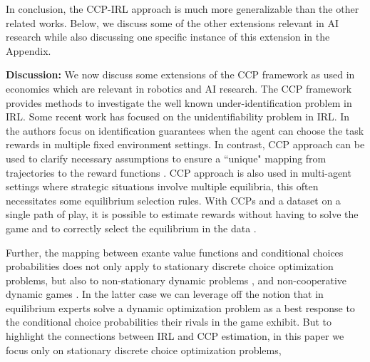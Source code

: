 \documentclass{article}
\begin{document}
In conclusion, the CCP-IRL approach is much more generalizable than the other related works. Below, we discuss some of the other extensions relevant in AI research while also discussing one specific instance of this extension in the Appendix.


\textbf{Discussion:} 
We now discuss some extensions of the CCP framework as used in economics which are relevant in robotics and AI research.  
The CCP framework provides methods to investigate the well known under-identification problem in IRL. Some recent work \cite{amin2017repeated} has focused on the unidentifiability problem in IRL. In \cite{amin2017repeated} the authors focus on identification guarantees when the agent can choose the task rewards in multiple fixed environment settings. In contrast, CCP approach can be used to clarify necessary assumptions to ensure a ``unique" mapping from trajectories to the reward functions \cite{magnac}. CCP approach is also used in multi-agent settings where strategic situations involve multiple equilibria, this often necessitates some equilibrium selection rules. With CCPs and a dataset on a single path of play, it is possible to estimate rewards without having to solve the game and to correctly select the equilibrium in the data \cite{pese}.

Further, the mapping between exante value functions and conditional choices probabilities does not only apply to stationary discrete choice optimization problems, but also to non-stationary dynamic problems \cite{arcidiacono2014nonstationary}, and non-cooperative dynamic games \cite{bajari}. In the latter case we can leverage off the notion that in equilibrium experts solve a dynamic optimization problem as a best response to the conditional choice probabilities their rivals in the game exhibit. But to highlight the connections between IRL and CCP estimation, in this paper we focus only on stationary discrete choice optimization problems,

\end{document}
